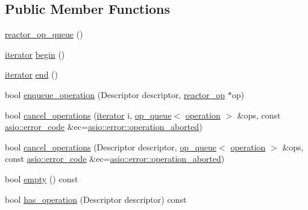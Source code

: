 \subsection*{Public Member Functions}
\begin{DoxyCompactItemize}
\item 
\hyperlink{classasio_1_1detail_1_1reactor__op__queue_a3d4dc141c50d2f58f63921ef38792cbc}{reactor\+\_\+op\+\_\+queue} ()
\item 
\hyperlink{classasio_1_1detail_1_1reactor__op__queue_a3c73fd6c8576d3a1ad1eb4f320f2395a}{iterator} \hyperlink{classasio_1_1detail_1_1reactor__op__queue_ab03877b72075a83aea2dfecc4d62f936}{begin} ()
\item 
\hyperlink{classasio_1_1detail_1_1reactor__op__queue_a3c73fd6c8576d3a1ad1eb4f320f2395a}{iterator} \hyperlink{classasio_1_1detail_1_1reactor__op__queue_ab43ded196c65505fc9e284760d9f1d0f}{end} ()
\item 
bool \hyperlink{classasio_1_1detail_1_1reactor__op__queue_ae65e1dc06e54c4d4a91adb5479667ca6}{enqueue\+\_\+operation} (Descriptor descriptor, \hyperlink{classasio_1_1detail_1_1reactor__op}{reactor\+\_\+op} $\ast$op)
\item 
bool \hyperlink{classasio_1_1detail_1_1reactor__op__queue_acf193649e00cc85711c47e2cc7cb3abf}{cancel\+\_\+operations} (\hyperlink{classasio_1_1detail_1_1reactor__op__queue_a3c73fd6c8576d3a1ad1eb4f320f2395a}{iterator} i, \hyperlink{classasio_1_1detail_1_1op__queue}{op\+\_\+queue}$<$ \hyperlink{namespaceasio_1_1detail_a338968609bec20e37145309f8f9ec936}{operation} $>$ \&ops, const \hyperlink{classasio_1_1error__code}{asio\+::error\+\_\+code} \&ec=\hyperlink{namespaceasio_1_1error_a2a69445eee784059ac2f4a6c4f5fe90dacde6760763051561f6c2ffc4ddf2be1b}{asio\+::error\+::operation\+\_\+aborted})
\item 
bool \hyperlink{classasio_1_1detail_1_1reactor__op__queue_a6965d6a81216d531322772c2cbb5f71c}{cancel\+\_\+operations} (Descriptor descriptor, \hyperlink{classasio_1_1detail_1_1op__queue}{op\+\_\+queue}$<$ \hyperlink{namespaceasio_1_1detail_a338968609bec20e37145309f8f9ec936}{operation} $>$ \&ops, const \hyperlink{classasio_1_1error__code}{asio\+::error\+\_\+code} \&ec=\hyperlink{namespaceasio_1_1error_a2a69445eee784059ac2f4a6c4f5fe90dacde6760763051561f6c2ffc4ddf2be1b}{asio\+::error\+::operation\+\_\+aborted})
\item 
bool \hyperlink{classasio_1_1detail_1_1reactor__op__queue_a7aac24c6ff44e2365d2dd882dc7bf8fb}{empty} () const 
\item 
bool \hyperlink{classasio_1_1detail_1_1reactor__op__queue_a95bf56fba2de831a1c76b9bf943bcfab}{has\+\_\+operation} (Descriptor descriptor) const 

\end{DoxyCompactItemize}
